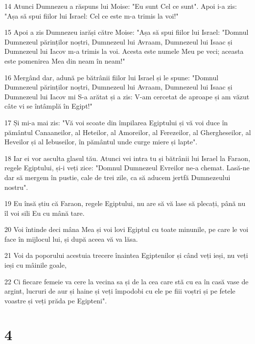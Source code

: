 \par 14 Atunci Dumnezeu a răspuns lui Moise: "Eu sunt Cel ce sunt". Apoi i-a zis: "Așa să spui fiilor lui Israel: Cel ce este m-a trimis la voi!"
\par 15 Apoi a zis Dumnezeu iarăși către Moise: "Așa să spui fiilor lui Israel: "Domnul Dumnezeul părinților noștri, Dumnezeul lui Avraam, Dumnezeul lui Isaac și Dumnezeul lui Iacov m-a trimis la voi. Acesta este numele Meu pe veci; aceasta este pomenirea Mea din neam în neam!"
\par 16 Mergând dar, adună pe bătrânii fiilor lui Israel și le spune: "Domnul Dumnezeul părinților noștri, Dumnezeul lui Avraam, Dumnezeul lui Isaac și Dumnezeul lui Iacov mi S-a arătat și a zis: V-am cercetat de aproape și am văzut câte vi se întâmplă în Egipt!"
\par 17 Și mi-a mai zis: "Vă voi scoate din împilarea Egiptului și vă voi duce în pământul Canaaneilor, al Heteilor, al Amoreilor, al Ferezeilor, al Ghergheseilor, al Heveilor și al Iebuseilor, în pământul unde curge miere și lapte".
\par 18 Iar ei vor asculta glasul tău. Atunci vei intra tu și bătrânii lui Israel la Faraon, regele Egiptului, și-i veți zice: "Domnul Dumnezeul Evreilor ne-a chemat. Lasă-ne dar să mergem în pustie, cale de trei zile, ca să aducem jertfă Dumnezeului nostru".
\par 19 Eu însă știu că Faraon, regele Egiptului, nu are să vă lase să plecați, până nu îl voi sili Eu cu mână tare.
\par 20 Voi întinde deci mâna Mea și voi lovi Egiptul cu toate minunile, pe care le voi face în mijlocul lui, și după aceea vă va lăsa.
\par 21 Voi da poporului acestuia trecere înaintea Egiptenilor și când veți ieși, nu veți ieși cu mâinile goale,
\par 22 Ci fiecare femeie va cere la vecina sa și de la cea care stă cu ea în casă vase de argint, lucruri de aur și haine și veți împodobi cu ele pe fiii voștri și pe fetele voastre și veți prăda pe Egipteni".

\chapter{4}

